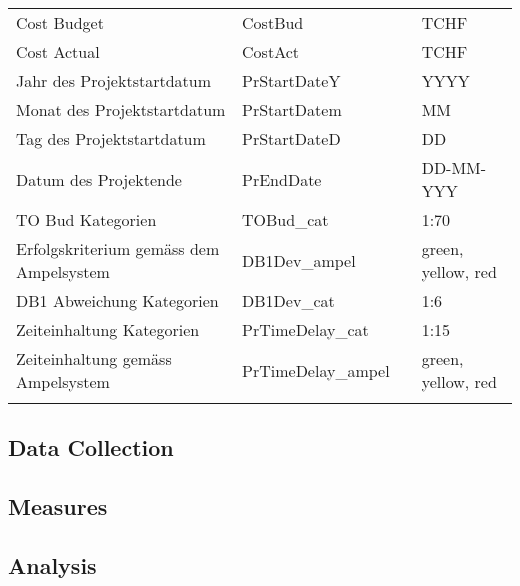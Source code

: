 \begin{landscape}
\begin{center}
\begin{longtable}{p{6cm}|p{4cm}|p{6cm}|p{3cm}}
		Cost Budget & CostBud &       & TCHF \\
		Cost Actual & CostAct &       & TCHF \\
		Jahr des Projektstartdatum & PrStartDateY &       & YYYY \\
		Monat des Projektstartdatum & PrStartDatem &       & MM \\
		Tag des Projektstartdatum & PrStartDateD &       & DD \\
		Datum des Projektende & PrEndDate &       & DD-MM-YYY \\
		TO Bud Kategorien & TOBud\_cat &       & {1:70} \\
		Erfolgskriterium gemäss dem Ampelsystem & DB1Dev\_ampel &       & {green, yellow, red} \\
		DB1 Abweichung Kategorien & DB1Dev\_cat &       & {1:6} \\
		Zeiteinhaltung Kategorien & PrTimeDelay\_cat &       & {1:15} \\
		Zeiteinhaltung gemäss Ampelsystem & PrTimeDelay\_ampel &       & {green, yellow, red} \\
		
	\label{tab:addlabel}%
\end{longtable}%
\end{center}
\end{landscape}
\subsection*{Data Collection}
\subsection*{Measures}
\subsection*{Analysis}